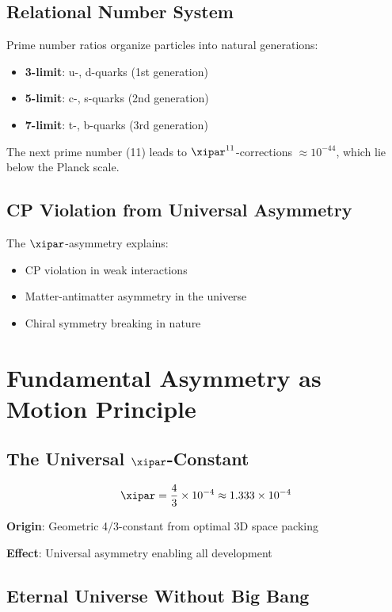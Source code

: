 	\subsection{Relational Number System}
	
	Prime number ratios organize particles into natural generations:
	
	\begin{itemize}
		\item \textbf{3-limit}: u-, d-quarks (1st generation)
		\item \textbf{5-limit}: c-, s-quarks (2nd generation)
		\item \textbf{7-limit}: t-, b-quarks (3rd generation)
	\end{itemize}
	
	The next prime number (11) leads to $\xipar^{11}$-corrections $\approx 10^{-44}$, which lie below the Planck scale.
	
	\subsection{CP Violation from Universal Asymmetry}
	
	The $\xipar$-asymmetry explains:
	\begin{itemize}
		\item CP violation in weak interactions
		\item Matter-antimatter asymmetry in the universe
		\item Chiral symmetry breaking in nature
	\end{itemize}
	
	\section{Fundamental Asymmetry as Motion Principle}
	
	\subsection{The Universal $\xipar$-Constant}
	
	\begin{equation}
		\xipar = \frac{4}{3} \times 10^{-4} \approx 1.333 \times 10^{-4}
	\end{equation}
	
	\textbf{Origin}: Geometric 4/3-constant from optimal 3D space packing
	
	\textbf{Effect}: Universal asymmetry enabling all development
	
	\subsection{Eternal Universe Without Big Bang}
	
